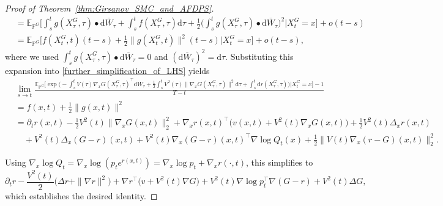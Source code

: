 \documentclass{article}
\theoremstyle{plain}
\theoremstyle{definition}
\theoremstyle{remark}
\newcommand{\dif}{{\mathrm{d}}}
\renewcommand{\P}{{\mathbb{P}}}
\begin{document}
\begin{proof}[Proof of Theorem~\ref{thm:Girsanov_SMC_and_AFDPS}]
\begin{align*}
&= \mathbb{E}_{\P^G}\Bigg[\int_s^t g(X_\tau^G,\tau)\bullet \dif \overline W_\tau
    + \int_s^t f(X_\tau^G,\tau)\dif \tau
    + \frac12\Bigg(\int_s^t g(X_\tau^G,\tau)\bullet \dif \overline W_\tau\Bigg)^{2}\Bigg|X_t^G=x\Bigg]
    + o(t-s) \\
&= \mathbb{E}_{\P^G}\Bigg[f(X_t^G,t)(t-s) + \frac12\|g(X_t^G,t)\|^2 (t-s)\Bigg|X_t^G=x\Bigg]
    + o(t-s),
\end{align*}
where we used \(\int_s^t g(X_\tau^G,\tau)\bullet \dif \overline W_\tau = 0\) and \((\dif\overline W_\tau)^2 = \dif \tau\).
Substituting this expansion into \eqref{further_simplification_of_LHS} yields
\begin{align*}
&\lim_{s\to t}\frac{\mathbb{E}_{\P^G}\Bigg[\exp\Bigg(
-\int_s^t V(\tau)\nabla_x G(X_\tau^G,\tau)^{\top} \dif W_\tau
+ \frac12\int_s^t V^2(\tau)\|\nabla_x G(X_\tau^G,\tau)\|^2 \dif \tau
+ \int_s^t \dif r(X_\tau^G,\tau)
\Bigg)\Bigg|X_t^G=x\Bigg]-1}{T-t} \\
&= f(x,t) + \frac12\|g(x,t)\|^2 \\
&= \partial_t r(x,t) -\frac12 V^2(t)\|\nabla_x G(x,t)\|^2_2
 + \nabla_x r(x,t)^{\top}\Bigg(v(x,t)+V^2(t)\nabla_x G(x,t)\Bigg)
 + \frac12 V^2(t)\Delta_x r(x,t) \\
&\quad + V^2(t)\Delta_x(G-r)(x,t)
 + V^2(t)\nabla_x(G-r)(x,t)^{\top}\nabla\log Q_t(x)
 + \frac12\|V(t)\nabla_x(r-G)(x,t)\|^2_2.
\end{align*}

Using \(\nabla_x\log Q_t = \nabla_x\log(p_t e^{r(x,t)})=\nabla_x\log p_t + \nabla_x r(\cdot, t)\), this simplifies to
\[
\partial_t r-\frac{V^2(t)}{2}\Bigg(\Delta r + \|\nabla r\|^2\Bigg)
+ \nabla r^{\top}\Bigg(v + V^2(t)\nabla G\Bigg)
+ V^2(t)\nabla\log p_t^{\top}\nabla(G-r)
+ V^2(t)\Delta G,
\]
which establishes the desired identity.
\end{proof}
\end{document}
